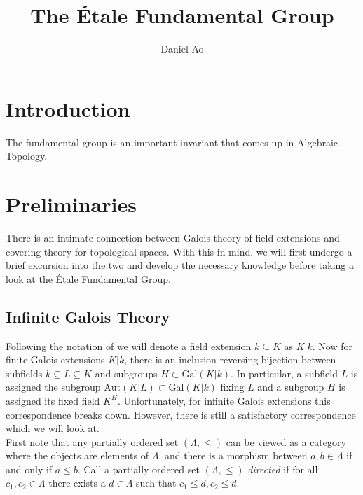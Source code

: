 \documentclass{article}
\theoremstyle{definition}
\theoremstyle{remark}
\begin{document}
\title{The \'Etale Fundamental Group}
\author{Daniel Ao}

\maketitle

\tableofcontents

\section{Introduction}

The fundamental group is an important invariant that comes up in Algebraic Topology. 

\section{Preliminaries}

There is an intimate connection between Galois theory of field extensions and covering theory for topological spaces.
With this in mind, we will first undergo a brief excursion into the two and develop the necessary knowledge before taking a look at the \'Etale Fundamental Group.

\subsection{Infinite Galois Theory}

Following the notation of \cite{Szamuely} we will denote a field extension $k \subseteq K$ as $K|k$. 
Now for finite Galois extensions $K|k$, there is an inclusion-reversing bijection between subfields $k \subseteq L \subseteq K$ and subgroups $H \subset \text{Gal}(K|k)$.
In particular, a subfield $L$ is assigned the subgroup $\text{Aut}(K|L) \subset \text{Gal}(K|k)$ fixing $L$ and a subgroup $H$ is assigned its fixed field $K^H$.
Unfortunately, for infinite Galois extensions this correspondence breaks down.
However, there is still a satisfactory correspondence which we will look at.\\

First note that any partially ordered set $(\Lambda, \leq)$ can be viewed as a category where the objects are elements of $\Lambda$, and there is a morphism between $a,b \in \Lambda$ if and only if $a \leq b$.
Call a partially ordered set $(\Lambda, \leq)$ \textit{directed} if for all $c_1, c_2 \in \Lambda$ there exists a $d \in \Lambda$ such that $c_1 \leq d, c_2 \leq d$.
\end{document}
